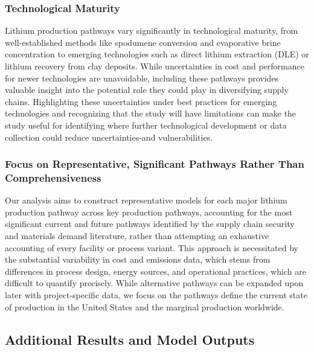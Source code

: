 \subsubsection{Technological Maturity}\label{app:04-limitations-maturity}

Lithium production pathways vary significantly in technological maturity, from well-established methods like spodumene conversion and evaporative brine concentration to emerging technologies such as direct lithium extraction (DLE) or lithium recovery from clay deposits. While uncertainties in cost and performance for newer technologies are unavoidable, including these pathways provides valuable insight into the potential role they could play in diversifying supply chains. Highlighting these uncertainties under best practices for emerging technologies \cite{woods-robinsonControversyConsensusCommon2025, bredehoeft47R11CostEstimate2020} and recognizing that the study will have limitations can make the study useful for identifying where further technological development or data collection could reduce uncertainties-and vulnerabilities.

\subsubsection{Focus on Representative, Significant Pathways Rather Than Comprehensiveness}\label{app:04-limitations-representative}

Our analysis aims to construct representative models for each major lithium production pathway across key production pathways, accounting for the most significant current and future pathways identified by the supply chain security and materials demand literature, rather than attempting an exhaustive accounting of every facility or process variant. This approach is necessitated by the substantial variability in cost and emissions data, which stems from differences in process design, energy sources, and operational practices, which are difficult to quantify precisely. While alternative pathways can be expanded upon later with project-specific data, we focus on the pathways define the current state of production in the United States and the marginal production worldwide. 

\clearpage
\subsection{Additional Results and Model Outputs}\label{app:04-moreresults}

